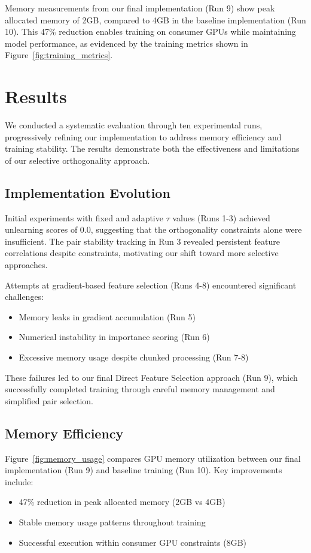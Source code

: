 \documentclass{article} %
\begin{document}
Memory measurements from our final implementation (Run 9) show peak allocated memory of 2GB, compared to 4GB in the baseline implementation (Run 10). This 47\% reduction enables training on consumer GPUs while maintaining model performance, as evidenced by the training metrics shown in Figure~\ref{fig:training_metrics}.

\section{Results}
\label{sec:results}

We conducted a systematic evaluation through ten experimental runs, progressively refining our implementation to address memory efficiency and training stability. The results demonstrate both the effectiveness and limitations of our selective orthogonality approach.

\subsection{Implementation Evolution}
Initial experiments with fixed and adaptive $\tau$ values (Runs 1-3) achieved unlearning scores of 0.0, suggesting that the orthogonality constraints alone were insufficient. The pair stability tracking in Run 3 revealed persistent feature correlations despite constraints, motivating our shift toward more selective approaches.

Attempts at gradient-based feature selection (Runs 4-8) encountered significant challenges:
\begin{itemize}
    \item Memory leaks in gradient accumulation (Run 5)
    \item Numerical instability in importance scoring (Run 6)
    \item Excessive memory usage despite chunked processing (Run 7-8)
\end{itemize}

These failures led to our final Direct Feature Selection approach (Run 9), which successfully completed training through careful memory management and simplified pair selection.

\subsection{Memory Efficiency}
Figure~\ref{fig:memory_usage} compares GPU memory utilization between our final implementation (Run 9) and baseline training (Run 10). Key improvements include:
\begin{itemize}
    \item 47\% reduction in peak allocated memory (2GB vs 4GB)
    \item Stable memory usage patterns throughout training
    \item Successful execution within consumer GPU constraints (8GB)
\end{itemize}
\end{document}
